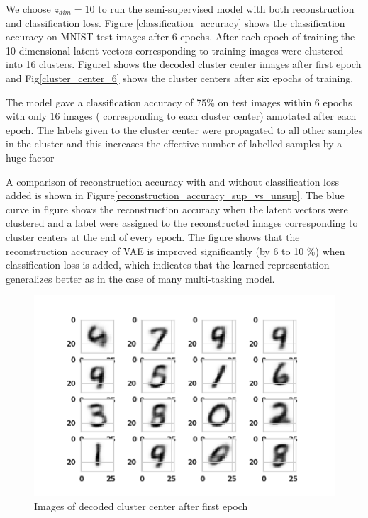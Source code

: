 \documentclass{uai2021} %
\begin{document}
We choose $z_{dim}=10$ to run the  semi-supervised model with both reconstruction and classification loss.
Figure \ref{classification_accuracy} shows the classification accuracy on MNIST test images after 6 epochs.
After each epoch of training the 10 dimensional latent vectors corresponding to training images were clustered into 16 clusters.
Figure\ref{cluster_center_1} shows the decoded cluster center images after first epoch and Fig\ref{cluster_center_6} shows the cluster centers after six epochs of training.


The model gave a classification accuracy of 75\% on test images within 6 epochs with only 16 images ( corresponding to each  cluster center) annotated after each epoch.
The labels given to the cluster center were propagated to all other samples in the cluster and this increases the effective number of labelled samples by a huge factor

A comparison of reconstruction accuracy with and without classification loss added is shown in Figure\ref{reconstruction_accuracy_sup_vs_unsup}.
The blue curve in figure shows the reconstruction accuracy when the latent vectors were clustered and a label were assigned to the reconstructed images corresponding to  cluster centers at the end of every epoch.
The figure shows that the reconstruction accuracy of VAE is improved significantly  (by 6 to 10 \%) when classification loss is added, which indicates that the learned representation generalizes better as in the case of many multi-tasking model.

\begin{figure}[]
\centering
\includegraphics[width=\linewidth]{cluster_centers_epoch_1.0}
\caption{Images of decoded cluster center after first epoch}
\label{cluster_center_1}
\end{figure}
\end{document}
